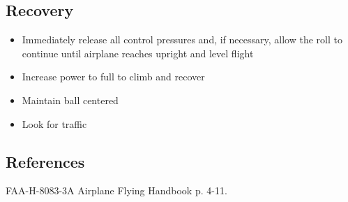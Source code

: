 \subsection{Recovery}

\begin{itemize}
  \item Immediately release all control pressures and, if necessary, allow the
    roll to continue until airplane reaches upright and level flight
  \item Increase power to full to climb and recover
  \item Maintain ball centered
  \item Look for traffic
\end{itemize}

\subsection{References}

FAA-H-8083-3A Airplane Flying Handbook p. 4-11.
